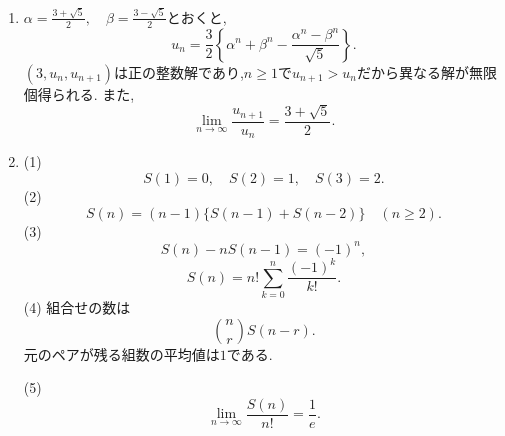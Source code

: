 \begin{enumerate}[label=\textbf{問\arabic*.},leftmargin=3.8em,format=\bookitemlink{practice-entrance}{answer}{solution}]
    (3)~$\gcd(a_m,a_n)=a_{\gcd(m,n)}$であり,
    \[
      \boxed{\gcd(a_{2026},a_{3040})=a_2=2}.
    \]
  \item $\alpha=\frac{3+\sqrt5}2,\quad
      \beta=\frac{3-\sqrt5}2$とおくと,
    \[
      \boxed{\displaystyle
        u_n=\frac32\left\{
        \alpha^n+\beta^n-
        \frac{\alpha^n-\beta^n}{\sqrt5}
        \right\}}.
    \]
    $(3,u_n,u_{n+1})$は正の整数解であり,$n\ge1$で$u_{n+1}>u_n$だから異なる解が無限個得られる.
    また,
    \[
      \boxed{\displaystyle
        \lim_{n\to\infty}\frac{u_{n+1}}{u_n}
        =\frac{3+\sqrt5}2}.
    \]
  \item (1)
    \[
      S(1)=0,\quad S(2)=1,\quad S(3)=2.
    \]
    (2)
    \[
      S(n)=(n-1)\{S(n-1)+S(n-2)\}
      \quad(n\ge2).
    \]
    (3)
    \[
      S(n)-nS(n-1)=(-1)^n,
    \]
    \[
      \boxed{S(n)=n!\sum_{k=0}^{n}\frac{(-1)^k}{k!}}.
    \]
    (4) 組合せの数は
    \[
      \binom{n}{r}S(n-r).
    \]
    元のペアが残る組数の平均値は$1$である.
    \par\noindent
    (5)
    \[
      \lim_{n\to\infty}\frac{S(n)}{n!}=\frac1e.
    \]
\end{enumerate}

